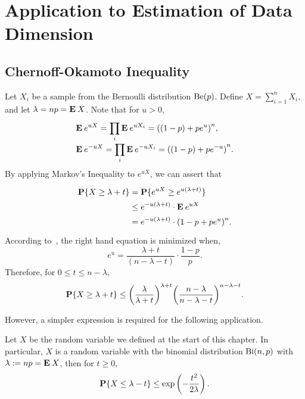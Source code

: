 \chapter{Application to Estimation of Data Dimension}

\section{Chernoff-Okamoto Inequality}

Let $X_i$ be a sample from the Bernoulli distribution $\Be(p)$. Define $ X = \sum_{i = 1}^n X_i$, and let $\lambda = np = \E X$. 
Note that for $u > 0$, 
  \begin{equation}\label{co:1}
    \everymath{\displaystyle}\arraycolsep=1.4pt\def\arraystretch{1.5}
  \begin{array}{l}
    \E e^{uX} = \prod_i \E e^{uX_i} = {((1-p) + p e^{u})}^n,\\
    \E e^{-uX} = \prod_i \E e^{-uX_i} = {((1-p) + p e^{-u})}^n.
  \end{array} 
  \end{equation}
  By applying Markov's Inequality to $e^{uX}$, we can assert that
  \[\everymath{\displaystyle}\arraycolsep=1.4pt\def\arraystretch{1.5}
  \begin{array}{rcl}
    \P\{X \geq \lambda + t\} & = & \P\{e^{uX} \geq e^{u(\lambda + t)}\}\\
    & \leq & e^{-u(\lambda+t)} \cdot \E e^{uX}\\
    & = & e^{-u(\lambda+ t)} \cdot {(1-p + p e^{u})}^n. 
  \end{array} \] 
  According to~\cite{janson2002concentration}, the right hand equation is minimized when,
  \[ e^{u} = \frac{\lambda+t}{(n-\lambda-t)} \cdot \frac{1-p}{p}. \]
  Therefore, for $0 \leq t \leq n-\lambda$,
  \begin{equation}\label{co:2}
    \P\{X \geq \lambda + t\} \leq {\left(\frac{\lambda}{\lambda+t}\right)}^{\lambda + t} {\left(\frac{n-\lambda}{n-\lambda-t}\right)}^{n - \lambda - t}.
  \end{equation}

  However, a simpler expression is required for the following application.

\begin{theorem}\label{co:T1}
  Let $X$ be the random variable we defined at the start of this chapter. In particular, $X$ is a random variable with the binomial distribution $\Bi(n,p)$ with $\lambda := np = \E X$, then for $t \geq 0$,
  \begin{equation}\label{co:3}
    \P\{X \leq \lambda - t\} \leq \exp\left(- \frac{t^2}{2\lambda}\right).
  \end{equation}
\end{theorem}

